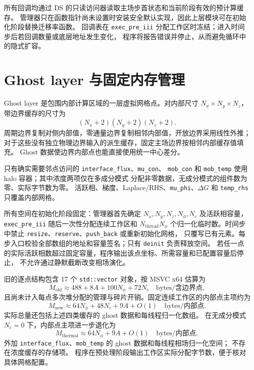 \documentclass[UTF8,a4paper,11pt]{ctexart}
\begin{document}
所有回调均通过 DS 的只读访问器读取主场步首状态和当前阶段有效的预计算缓存。
管理器只在函数指针尚未设置时安装安全默认实现，因此上层模块可在初始化阶段替换迁移率函数。
回调表在 \texttt{exec\_pre\_iii} 分配工作区时冻结；进入时间步后若回调数量或底层地址发生变化，
程序将报告错误并停止，从而避免循环中的隐式扩容。

\section{Ghost layer 与固定内存管理}

Ghost layer 是包围内部计算区域的一层虚拟网格点。对内部尺寸
\(N_x\times N_y\times N_z\)，带边界缓存的尺寸为
\begin{equation}
 (N_x+2)(N_y+2)(N_z+2).
\end{equation}
周期边界复制对侧内部值，零通量边界复制相邻内部值，开放边界采用线性外推；
对于这些没有独立物理边界输入的派生缓存，固定主场边界按相邻内部缓存值填充。
Ghost 数据使边界内部点也能直接使用统一中心差分。

只有确实需要邻点访问的 \texttt{interface\_flux}、\texttt{mu\_con}、
\texttt{mob\_con} 和 \texttt{mob\_temp} 使用 halo 容器；其中浓度两项仅在多成分模式
分配非零数据，无成分模式的组件数为零、实际字节数为零。
活跃相、梯度、Laplace/RHS、\texttt{mu\_phi}、\(\Delta G\) 和
\texttt{temp\_rhs} 只覆盖内部网格。

所有空间在初始化阶段固定：管理器首先确定 \(N_x,N_y,N_z,N_\phi,N_c\)
及活跃相容量，\texttt{exec\_pre\_iii} 随后一次性分配连续工作区和
\(N_{\mathrm{thread}}N_\phi\) 个归一化临时数。时间步中禁止
\texttt{resize}、\texttt{reserve}、\texttt{push\_back} 或重新初始化网格，
只覆写已有元素。每步入口校验全部数组的地址和容量签名；只有
\texttt{deinit} 负责释放空间。
若任一点的实际活跃相数超过固定容量，程序输出该点坐标、所需容量和已配置容量后停止，
不允许通过静默截断改变相场演化。

旧的逐点结构包含 17 个 \texttt{std::vector} 对象，按 MSVC x64 估算为
\begin{equation}
 M_{\mathrm{old}}\approx488+8A+100N_\phi+72N_c
 \quad\text{bytes/含边界点},
\end{equation}
且尚未计入每点多次堆分配的管理与碎片开销。固定连续工作区的内部点主项约为
\begin{equation}
 M_{\mathrm{new}}\approx64N_\phi+48N_c+9A+O(1)
 \quad\text{bytes/内部点}.
\end{equation}
实际总量还包括上述四类缓存的 ghost 数据和每线程归一化数组。
在无成分模式 \(N_c=0\) 下，内部点主项进一步退化为
\begin{equation}
 M_{\mathrm{thermal}}\approx64N_\phi+9A+O(1)
 \quad\text{bytes/内部点},
\end{equation}
外加 \texttt{interface\_flux}、\texttt{mob\_temp} 的 ghost 数据和每线程相场归一化空间；
不存在浓度缓存的存储项。
程序在预处理阶段输出工作区实际分配字节数，便于核对具体网格配置。
\end{document}

